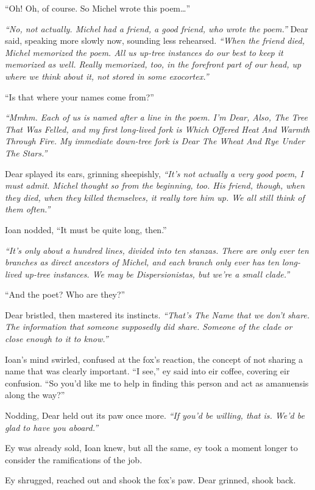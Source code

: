 ``Oh! Oh, of course. So Michel wrote this poem\ldots{}''

\emph{``No, not actually. Michel had a friend, a good friend, who wrote the poem.''} Dear said, speaking more slowly now, sounding less rehearsed. \emph{``When the friend died, Michel memorized the poem. All us up-tree instances do our best to keep it memorized as well. Really memorized, too, in the forefront part of our head, up where we think about it, not stored in some exocortex.''}

``Is that where your names come from?''

\emph{``Mmhm. Each of us is named after a line in the poem. I'm Dear, Also, The Tree That Was Felled, and my first long-lived fork is Which Offered Heat And Warmth Through Fire. My immediate down-tree fork is Dear The Wheat And Rye Under The Stars.''}

Dear splayed its ears, grinning sheepishly, \emph{``It's not actually a very good poem, I must admit. Michel thought so from the beginning, too. His friend, though, when they died, when they killed themselves, it really tore him up. We all still think of them often.''}

Ioan nodded, ``It must be quite long, then.''

\emph{``It's only about a hundred lines, divided into ten stanzas. There are only ever ten branches as direct ancestors of Michel, and each branch only ever has ten long-lived up-tree instances. We may be Dispersionistas, but we're a small clade.''}

``And the poet? Who are they?''

Dear bristled, then mastered its instincts. \emph{``That's The Name that we don't share. The information that someone supposedly did share. Someone of the clade or close enough to it to know.''}

Ioan's mind swirled, confused at the fox's reaction, the concept of not sharing a name that was clearly important. ``I see,'' ey said into eir coffee, covering eir confusion. ``So you'd like me to help in finding this person and act as amanuensis along the way?''

Nodding, Dear held out its paw once more. \emph{``If you'd be willing, that is. We'd be glad to have you aboard.''}

Ey was already sold, Ioan knew, but all the same, ey took a moment longer to consider the ramifications of the job.

Ey shrugged, reached out and shook the fox's paw. Dear grinned, shook back.

